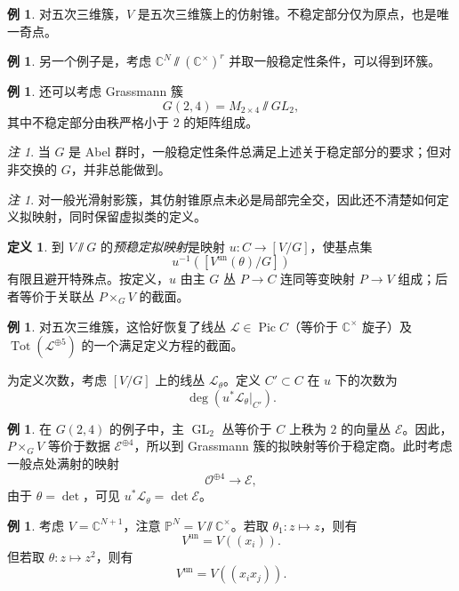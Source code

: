 \documentclass{amsart}
\theoremstyle{definition}
\newtheorem{defn}[thm]{定义}
\newtheorem{exm}[thm]{例}
\theoremstyle{remark}
\newtheorem{rmk}[thm]{注}
\theoremstyle{plain}
\theoremstyle{definition}
\theoremstyle{remark}
\newcommand{\C}{\mathbb{C}}
\renewcommand{\P}{\mathbb{P}}
\newcommand{\mc}[1]{\mathcal{#1}}
\newcommand{\mr}[1]{\mathrm{#1}}
\newcommand{\on}[1]{\operatorname{#1}}
\newcommand{\1}{\mathbf{1}}
\newcommand{\2}{\mathbf{2}}
\newcommand{\3}{\mathbf{3}}
\DeclareMathOperator{\Pic}{Pic}
\begin{document}
\begin{exm}
    对五次三维簇，\(V\) 是五次三维簇上的仿射锥。不稳定部分仅为原点，也是唯一奇点。
\end{exm}

\begin{exm}
    另一个例子是，考虑 \(\C^N \sslash (\C^{\times})^r\) 并取一般稳定性条件，可以得到环簇。
\end{exm}

\begin{exm}
    还可以考虑 Grassmann 簇
    \[ G(2,4) = M_{2\times 4} \sslash GL_2, \]
    其中不稳定部分由秩严格小于 \(2\) 的矩阵组成。
\end{exm}

\begin{rmk}
    当 \(G\) 是 Abel 群时，一般稳定性条件总满足上述关于稳定部分的要求；但对非交换的 \(G\)，并非总能做到。
\end{rmk}

\begin{rmk}
    对一般光滑射影簇，其仿射锥原点未必是局部完全交，因此还不清楚如何定义拟映射，同时保留虚拟类的定义。
\end{rmk}

\begin{defn}
    到 \(V \sslash G\) 的\textit{预稳定拟映射}是映射 \(u \colon C \to [V/G]\)，使基点集
    \[ u^{-1}([V^{\mr{un}}(\theta) / G]) \]
    有限且避开特殊点。按定义，\(u\) 由主 \(G\) 丛 \(P \to C\) 连同等变映射 \(P \to V\) 组成；后者等价于关联丛 \(P \times_G V\) 的截面。
\end{defn}

\begin{exm}
    对五次三维簇，这恰好恢复了线丛 \(\mc{L} \in \Pic C\)（等价于 \(\C^{\times}\) 旋子）及 \(\on{Tot}(\mc{L}^{\oplus 5})\) 的一个满足定义方程的截面。
\end{exm}

为定义次数，考虑 \([V/G]\) 上的线丛 \(\mc{L}_{\theta}\)。定义 \(C' \subset C\) 在 \(u\) 下的次数为
\[ \deg (u^* \mc{L}_{\theta}|_{C'}). \]

\begin{exm}
    在 \(G(2,4)\) 的例子中，主 \(\on{GL}_2\) 丛等价于 \(C\) 上秩为 \(2\) 的向量丛 \(\mc{E}\)。因此，\(P \times_G V\) 等价于数据 \(\mc{E}^{\oplus 4}\)，所以到 Grassmann 簇的拟映射等价于稳定商。此时考虑一般点处满射的映射
    \[ \mc{O}^{\oplus 4} \to \mc{E}, \]
    由于 \(\theta = \det\)，可见 \(u^* \mc{L}_{\theta} = \det \mc{E}\)。
\end{exm}

\begin{exm}
    考虑 \(V = \C^{N+1}\)，注意 \(\P^N = V \sslash \C^{\times}\)。若取 \(\theta_1 \colon z \mapsto z\)，则有
    \[ V^{\on{un}} = V((x_i)). \]
    但若取 \(\theta \colon z \mapsto z^2\)，则有
    \[ V^{\on{un}} = V((x_i x_j)). \]
\end{exm}
\end{document}
